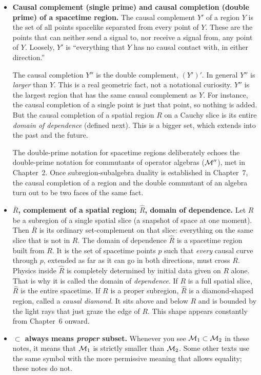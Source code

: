 \begin{itemize}
The tilde means that these sets are computed in the \emph{conformal completion} of the spacetime. This is a
technical device, standard in AdS/CFT, that adds a boundary ``at infinity,'' so that causal curves reaching
arbitrarily far away are still tracked properly. For now you can picture the ordinary causal future and past.
The tilde starts to matter when the conformal completion appears, in Chapter~6.

\item \textbf{Causal complement (single prime) and causal completion (double prime) of a spacetime region.}
The causal complement $Y'$ of a region $Y$ is the set of all points spacelike separated from every point of
$Y$. These are the points that can neither send a signal to, nor receive a signal from, any point of $Y$.
Loosely, $Y'$ is ``everything that $Y$ has no causal contact with, in either direction.''

The causal completion $Y''$ is the double complement, $(Y')'$. In general $Y''$ is \emph{larger} than $Y$.
This is a real geometric fact, not a notational curiosity. $Y''$ is the largest region that has the same
causal complement as $Y$. For instance, the causal completion of a single point is just that point, so
nothing is added. But the causal completion of a spatial region $R$ on a Cauchy slice is its entire
\emph{domain of dependence} (defined next). This is a bigger set, which extends into the past and the future.

The double-prime notation for spacetime regions deliberately echoes the double-prime notation for commutants
of operator algebras ($\mathcal{M}''$), met in Chapter~2. Once subregion-subalgebra duality is established in
Chapter~7, the causal completion of a region and the double commutant of an algebra turn out to be two faces
of the same fact.

\item \textbf{$\bar R$, complement of a spatial region; $\hat R$, domain of dependence.} Let $R$ be a
subregion of a single spatial slice (a snapshot of space at one moment). Then $\bar R$ is its ordinary
set-complement on that slice: everything on the same slice that is not in $R$. The domain of dependence
$\hat R$ is a spacetime region built from $R$. It is the set of spacetime points $p$ such that \emph{every}
causal curve through $p$, extended as far as it can go in both directions, must cross $R$. Physics inside
$\hat R$ is completely determined by initial data given on $R$ alone. That is why it is called the domain of
\emph{dependence}. If $R$ is a full spatial slice, $\hat R$ is the entire spacetime. If $R$ is a proper
subregion, $\hat R$ is a diamond-shaped region, called a \emph{causal diamond}. It sits above and below $R$
and is bounded by the light rays that just graze the edge of $R$. This shape appears constantly from
Chapter~6 onward.

\item \textbf{$\subset$ always means \emph{proper} subset.} Whenever you see $\mathcal{M}_1\subset\mathcal{M}_2$ in these notes,
it means that $\mathcal{M}_1$ is strictly smaller than $\mathcal{M}_2$. Some other texts use the same symbol with the more
permissive meaning that allows equality; these notes do not.
\end{itemize}

